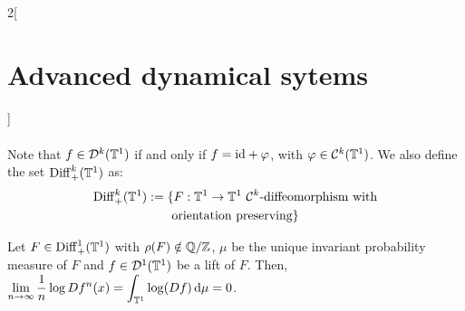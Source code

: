 \documentclass[../../../main_math.tex]{subfiles}
\begin{document}
\begin{multicols}{2}[\section{Advanced dynamical sytems}]
\begin{definition}
\begin{multline*}
    \end{multline*}
    Note that $f\in \mathcal{D}^k(\mathbb{T}^1)$ if and only if $f=\mathrm{id} +\varphi$, with $\varphi\in\mathcal{C}^k(\mathbb{T}^1)$.
    We also define the set $\mathrm{Diff}_+^k(\mathbb{T}^1)$ as:
    \begin{multline*}
      \mathrm{Diff}_+^k(\mathbb{T}^1):=\{F:\mathbb{T}^1\to\mathbb{T}^1 \text{ $\mathcal{C}^k$-diffeomorphism with}\\\text{orientation preserving}\}
    \end{multline*}
  \end{definition}
  \begin{proposition}
    Let $F\in\mathrm{Diff}_+^1(\mathbb{T}^1)$ with $\rho(F)\notin\quot{\QQ}{\ZZ}$, $\mu$ be the unique invariant probability measure of $F$ and $f\in\mathcal{D}^1(\mathbb{T}^1)$ be a lift of $F$. Then, $\displaystyle \lim_{n\to \infty}\frac{1}{n}\log Df^n(x)=\int_{\mathbb{T}^1}\log(Df)\dd{\mu}=0$.
  \end{proposition}
\end{multicols}
\end{document}
